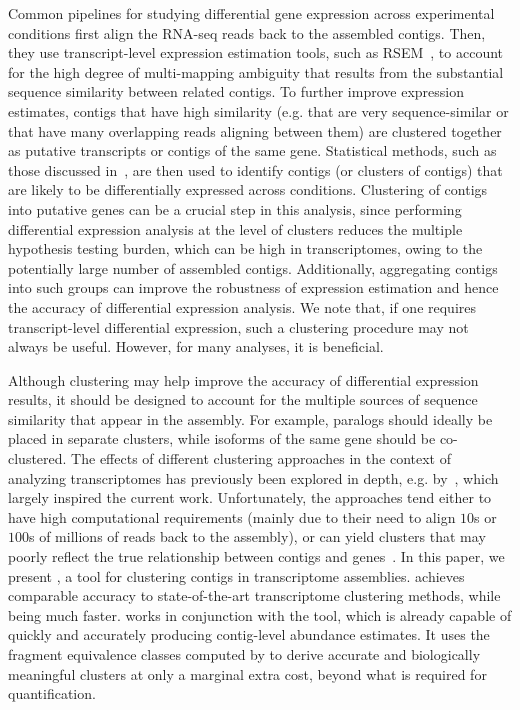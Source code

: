 Common pipelines for studying differential gene expression across experimental conditions first align the RNA-seq reads back to the assembled contigs.  Then, they use transcript-level expression estimation tools, such as RSEM~\citep{rsem}, to account for the high degree of multi-mapping ambiguity that results from the substantial sequence similarity between related contigs. To further improve expression estimates, contigs that have high similarity (e.g. that are very sequence-similar or that have many overlapping reads aligning between them) are clustered together as putative transcripts or contigs of the same gene. Statistical methods, such as those discussed in~\cite{kvam, soneson2013comparison}, are then used to identify contigs (or clusters of contigs) that are likely to be differentially expressed across conditions. Clustering of contigs into putative genes can be a crucial step in this analysis, since performing differential expression analysis at the level of clusters reduces the multiple hypothesis testing burden, which can be high in \denovo transcriptomes, owing to the potentially large number of assembled contigs.  Additionally, aggregating contigs into such groups can improve the robustness of expression estimation and hence the accuracy of differential expression analysis.  We note that, if one requires transcript-level differential expression, such a clustering procedure may not always be useful.  However, for many analyses, it is beneficial.

Although clustering may help improve the accuracy of differential expression results, it should be designed to account for the multiple sources of sequence similarity that appear in the assembly.  For example, paralogs should ideally be placed in separate clusters, while isoforms of the same gene should be co-clustered.  The effects of different clustering approaches in the context of analyzing \denovo transcriptomes has previously been explored in depth, e.g. by~\citet{corset}, which largely inspired the current work. Unfortunately, the approaches tend either to have high computational requirements (mainly due to their need to align $10$s or $100$s of millions of reads back to the assembly), or can yield clusters that may poorly reflect the true relationship between contigs and genes~\citep{cdhit}.  In this paper, we present \rapclust, a tool for clustering contigs in \denovo transcriptome assemblies.  \rapclust achieves comparable accuracy to state-of-the-art transcriptome clustering methods, while being much faster. \rapclust works in conjunction with the \sailfish tool, which is already capable of quickly and accurately producing contig-level abundance estimates.  It uses the fragment equivalence classes computed by \sailfish to derive accurate and biologically meaningful clusters at only a marginal extra cost, beyond what is required for quantification.

